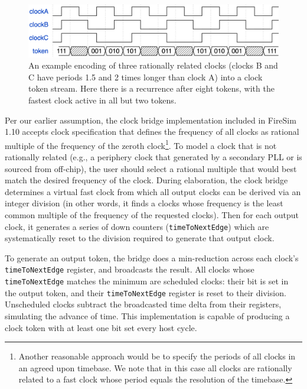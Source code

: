 \begin{figure}
    \centering
    \includegraphics[width=\textwidth]{figures/clock-token.png}
    \caption{An example encoding of three rationally related clocks (clocks B and C have periods
    1.5 and 2 times longer than clock A) into a clock token stream. Here there is a recurrence
    after eight tokens, with the fastest clock active in all but two tokens.}
    \label{fig:clock-token}
\end{figure}

Per our earlier assumption, the clock bridge implementation included in FireSim 1.10 accepts clock specification that
defines the frequency of all clocks as rational multiple of the
frequency of the zeroth clock\footnote{Another reasonable approach would be to
specify the periods of all clocks in an agreed upon timebase. We note
that in this case all clocks are rationally related to a fast clock whose
period equals the resolution of the timebase.}. To model a clock that is not
rationally related (e.g., a periphery clock that generated by a
secondary PLL or is sourced from off-chip), the user should select a rational
multiple that would best match the desired frequency of the clock.  During
elaboration, the clock bridge determines a virtual fast clock from which all
output clocks can be derived via an integer division (in other words, it finds
a clocks whose frequency is the least common multiple of the frequency of the
requested clocks). Then for each output clock, it generates a series of
down counters (\texttt{timeToNextEdge}) which are systematically reset to the
division required to generate that output clock.

To generate an output token, the bridge does a min-reduction across each clock's
\texttt{timeToNextEdge} register, and broadcasts the result. All clocks whose
\texttt{timeToNextEdge} matches the minimum are scheduled clocks: their bit is
set in the output token, and their \texttt{timeToNextEdge} register is reset to
their division. Unscheduled clocks subtract the broadcasted time delta from
their registers, simulating the advance of time.  This implementation is
capable of producing a clock token with at least one bit set every host cycle.

